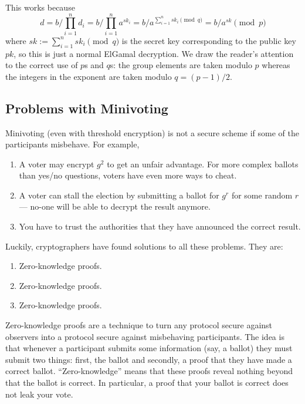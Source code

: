 \documentclass[envcountsame]{llncs}
\begin{document}
This works because
\[
d = b / \prod_{i=1}^n d_i = b / \prod_{i=1}^n a^{sk_i} = b / a^{\sum_{i=1}^n sk_i \pmod{q}} = b / a^{sk} \pmod{p}
\]
where $sk := \sum_{i=1}^n sk_i \pmod{q}$ is the secret key corresponding to the
public key $pk$, so this is just a normal ElGamal decryption.
We draw the reader's attention to the correct use of $p$s and $q$s: the group
elements are taken modulo $p$ whereas the integers in the exponent are taken
modulo $q = (p-1)/2$.

\subsection{Problems with Minivoting}

Minivoting (even with threshold encryption) is not a secure scheme if some of
the participants misbehave. For example,

\begin{enumerate}
\item A voter may encrypt $g^2$ to get an unfair advantage. For more complex ballots than yes/no questions, voters have even more ways to cheat.
\item A voter can stall the election by submitting a ballot for $g^r$ for some
random $r$ --- no-one will be able to decrypt the result anymore.
\item You have to trust the authorities that they have announced the correct
result.
\end{enumerate}

Luckily, cryptographers have found solutions to all these problems. They are:
\begin{enumerate}
\item Zero-knowledge proofs.
\item Zero-knowledge proofs.
\item Zero-knowledge proofs.
\end{enumerate}

Zero-knowledge proofs are a technique to turn any protocol secure against
observers into a protocol secure against misbehaving participants. The idea is
that whenever a participant submits some information (say, a ballot) they must
submit two things: first, the ballot and secondly, a proof that they have made a
correct ballot. ``Zero-knowledge'' means that these proofs reveal nothing
beyond that the ballot is correct. In particular, a proof that your ballot is
correct does not leak your vote.
\end{document}

